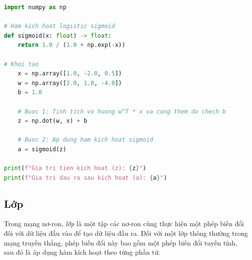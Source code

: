 \begin{lstlisting}[caption={Mã Python biểu diễn tính toán theo véc-tơ cho nơ-ron.}, language=Python]
import numpy as np

# Ham kich hoat logistic sigmoid
def sigmoid(x: float) -> float:
    return 1.0 / (1.0 + np.exp(-x))

# Khoi tao
    x = np.array([1.0, -2.0, 0.5])
    w = np.array([2.0, 1.0, -4.0])
    b = 1.0
    
    # Buoc 1: Tinh tich vo huong w^T * x va cong them do chech b
    z = np.dot(w, x) + b
    
    # Buoc 2: Ap dung ham kich hoat sigmoid
    a = sigmoid(z)

print(f"Gia tri tien kich hoat (z): {z}")
print(f"Gia tri dau ra sau kich hoat (a): {a}")
\end{lstlisting}

\subsection{Lớp}
Trong mạng nơ-ron, \textit{lớp} là một tập các nơ-ron cùng thực hiện một phép biến đổi đối với dữ liệu đầu vào để tạo dữ liệu đầu ra. Đối với một lớp thông thường trong mạng truyền thẳng, phép biến đổi này bao gồm một phép biến đổi tuyến tính, sau đó là áp dụng hàm kích hoạt theo từng phần tử.

